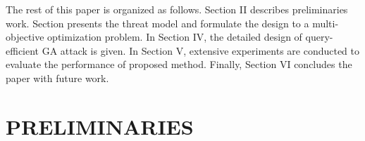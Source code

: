 \documentclass[lettersize,journal]{IEEEtran}
\begin{document}
The rest of this paper is organized as follows. Section II describes preliminaries work. Section presents the threat model and formulate the design to a multi-objective optimization problem. In Section IV, the detailed design of query-efficient GA attack is given. In Section V, extensive experiments are conducted to evaluate the performance of proposed method. Finally, Section VI concludes the paper with future work.







\section{PRELIMINARIES }

\end{document}
